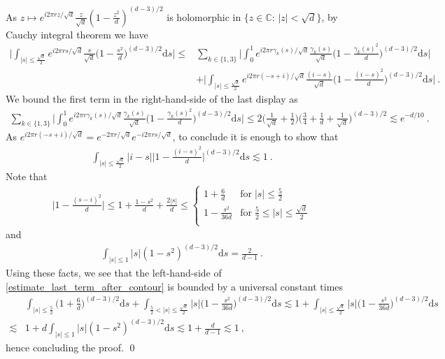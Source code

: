 \documentclass[a4paper, reqno]{amsart}
\theoremstyle{definition}
\newcommand{\dd}{{\mathrm d}}
\begin{document}
As $z\mapsto e^{i2\pi rz/ \sqrt{d}}\tfrac{z}{\sqrt{d}}(1-\tfrac{z^2}{d})^{(d-3)/2}$ is holomorphic in $\lbrace z\in\mathbb{C}:\, |z|<\sqrt{d}\rbrace$, by Cauchy integral theorem we have
\begin{align*}
     \bigg| \int_{|s|\leq \tfrac{\sqrt{d}}{2}} e^{i2\pi rs/ \sqrt{d}}\frac{s}{\sqrt{d}}\bigg(1-\frac{s^2}{d}\bigg)^{(d-3)/2}\dd s \bigg| \leq & \sum_{k\in\lbrace 1,3 \rbrace} \bigg| \int_0^1 e^{i2\pi r\gamma_k(s)/ \sqrt{d}}\frac{\gamma_k(s)}{\sqrt{d}}\bigg(1-\frac{\gamma_k(s)^2}{d}\bigg)^{(d-3)/2}\dd s \bigg|\\
    & + \bigg| \int_{|s|\leq \tfrac{\sqrt{d}}{2}} e^{i2\pi r(-s+i)/ \sqrt{d}}\frac{(i-s)}{\sqrt{d}}\bigg(1-\frac{(i-s)^2}{d}\bigg)^{(d-3)/2}\dd s \bigg|~.  
\end{align*}
We bound the first term in the right-hand-side of the last display as
\begin{align*}
    \sum_{k\in\lbrace 1,3 \rbrace} \bigg| \int_0^1 e^{i2\pi r\gamma_k(s)/ \sqrt{d}}\frac{\gamma_k(s)}{\sqrt{d}}\bigg(1-\frac{\gamma_k(s)^2}{d}\bigg)^{(d-3)/2}\dd s \bigg|\leq 2 \bigg(\frac{1}{\sqrt{d}}+\frac{1}{2}\bigg)\bigg(\frac{3}{4}+\frac{1}{d}+\frac{1}{\sqrt{d}}\bigg)^{(d-3)/2}\lesssim e^{-d/10}~.
\end{align*}
As $e^{i2\pi r(-s+i)/ \sqrt{d}}=e^{-2\pi r/\sqrt{d}}e^{-i2\pi rs/\sqrt{d}}$, to conclude it is enough to show that
\begin{align}\label{estimate_last_term_after_contour}
     \int_{|s|\leq \tfrac{\sqrt{d}}{2}} |i-s|\bigg|1-\frac{(i-s)^2}{d}\bigg|^{(d-3)/2}\dd s \lesssim 1~.
\end{align}
Note that
\begin{align*}
   \bigg| 1- \frac{(s-i)^2}{d} \bigg|\leq 1+\frac{1-s^2}{d}+\frac{2|s|}{d} \leq \begin{cases}
 1+\frac{6}{d} & \text{for} \; |s|\leq \frac{5}{2}\\
 1-\frac{s^2}{36d} & \text{for} \; \frac{5}{2}\leq |s| \leq \frac{\sqrt{d}}{2}\\
    \end{cases} 
\end{align*}
and
\begin{align*}%
 \int_{|s|\leq 1} |s|(1-s^2)^{(d-3)/2}\dd s= \frac{2}{d-1}~.
 \end{align*}
Using these facts, we see that the left-hand-side of \eqref{estimate_last_term_after_contour} is bounded by a universal constant times
 \begin{align*}
      & \int_{|s|\leq \tfrac{5}{2}} \bigg( 1+\frac{6}{d} \bigg)^{(d-3)/2}\dd s +  \int_{\tfrac{5}{2}<|s|\leq \tfrac{\sqrt{d}}{2}} |s|\bigg( 1-\frac{s^2}{36d} \bigg)^{(d-3)/2}\dd s  
      \lesssim  1+  \int_{|s|\leq \tfrac{\sqrt{d}}{2}} |s| \bigg(1-\frac{s^2}{36d}\bigg)^{(d-3)/2}\dd s \\
        \lesssim & 1+ d\int_{|s|\leq 1} |s|(1-s^2)^{(d-3)/2}\dd s \lesssim 1+   \frac{d}{d-1} 
        \lesssim  1~,
 \end{align*}
 hence concluding the proof.
 \qed 
\end{document}
